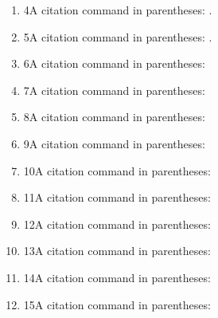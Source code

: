 \documentclass[11pt, a4]{article} %
\begin{document}
\begin{enumerate}
    \item 4A citation command in parentheses: \parencite{chinchiuan:2014ac}.
    \item 5A citation command in parentheses: \parencite{dai:2014ad}.
    \item 6A citation command in parentheses: \parencite{fielding:1999ae}
    \item 7A citation command in parentheses: \parencite{hedge:2005af}
    \item 8A citation command in parentheses: \parencite{Imt.org:2015ag}
    \item 9A citation command in parentheses: \parencite{Lan:2012ah}
    \item 10A citation command in parentheses: \parencite{liu:2017aj}
    \item 11A citation command in parentheses: \parencite{oseland:2012ak}
    \item 12A citation command in parentheses: \parencite{richardson:2021al}
    \item 13A citation command in parentheses: \parencite{sharp:2022am}
    \item 14A citation command in parentheses: \parencite{vickers:2021an}
    \item 15A citation command in parentheses: \parencite{newman:2015ap}
    \end{enumerate}
\end{document}
